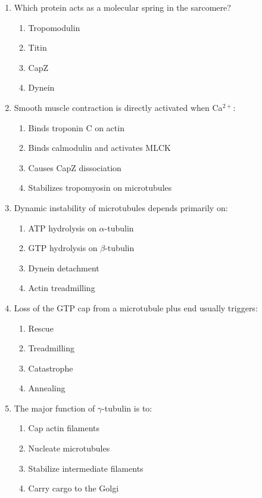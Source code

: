 \documentclass[12pt,fontset=none]{ctexart}
\begin{document}
\begin{enumerate}
\item Which protein acts as a molecular spring in the sarcomere?
\begin{enumerate}[label=\alph*.]
\item Tropomodulin
\item Titin
\item CapZ
\item Dynein
\end{enumerate}

\item Smooth muscle contraction is directly activated when Ca$^{2+}$:
\begin{enumerate}[label=\alph*.]
\item Binds troponin C on actin
\item Binds calmodulin and activates MLCK
\item Causes CapZ dissociation
\item Stabilizes tropomyosin on microtubules
\end{enumerate}

\item Dynamic instability of microtubules depends primarily on:
\begin{enumerate}[label=\alph*.]
\item ATP hydrolysis on $\alpha$-tubulin
\item GTP hydrolysis on $\beta$-tubulin
\item Dynein detachment
\item Actin treadmilling
\end{enumerate}

\item Loss of the GTP cap from a microtubule plus end usually triggers:
\begin{enumerate}[label=\alph*.]
\item Rescue
\item Treadmilling
\item Catastrophe
\item Annealing
\end{enumerate}

\item The major function of $\gamma$-tubulin is to:
\begin{enumerate}[label=\alph*.]
\item Cap actin filaments
\item Nucleate microtubules
\item Stabilize intermediate filaments
\item Carry cargo to the Golgi
\end{enumerate}


\end{enumerate}
\end{document}
